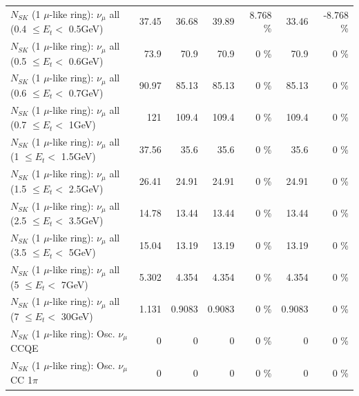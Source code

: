 \begin{table}
\begin{tabular}{| l | r | r | r  r | r  r |}
       $N_{SK}$ (1 $\mu$-like ring): $\nu_{\mu}$ all (0.4 $\leq E_{t} <$ 0.5GeV) &           37.45 &           36.68 &           39.89 &    8.768 \%  &           33.46 &   -8.768 \%  \\ 
       $N_{SK}$ (1 $\mu$-like ring): $\nu_{\mu}$ all (0.5 $\leq E_{t} <$ 0.6GeV) &            73.9 &            70.9 &            70.9 &        0 \%  &            70.9 &        0 \%  \\ 
       $N_{SK}$ (1 $\mu$-like ring): $\nu_{\mu}$ all (0.6 $\leq E_{t} <$ 0.7GeV) &           90.97 &           85.13 &           85.13 &        0 \%  &           85.13 &        0 \%  \\ 
         $N_{SK}$ (1 $\mu$-like ring): $\nu_{\mu}$ all (0.7 $\leq E_{t} <$ 1GeV) &             121 &           109.4 &           109.4 &        0 \%  &           109.4 &        0 \%  \\ 
         $N_{SK}$ (1 $\mu$-like ring): $\nu_{\mu}$ all (1 $\leq E_{t} <$ 1.5GeV) &           37.56 &            35.6 &            35.6 &        0 \%  &            35.6 &        0 \%  \\ 
       $N_{SK}$ (1 $\mu$-like ring): $\nu_{\mu}$ all (1.5 $\leq E_{t} <$ 2.5GeV) &           26.41 &           24.91 &           24.91 &        0 \%  &           24.91 &        0 \%  \\ 
       $N_{SK}$ (1 $\mu$-like ring): $\nu_{\mu}$ all (2.5 $\leq E_{t} <$ 3.5GeV) &           14.78 &           13.44 &           13.44 &        0 \%  &           13.44 &        0 \%  \\ 
         $N_{SK}$ (1 $\mu$-like ring): $\nu_{\mu}$ all (3.5 $\leq E_{t} <$ 5GeV) &           15.04 &           13.19 &           13.19 &        0 \%  &           13.19 &        0 \%  \\ 
           $N_{SK}$ (1 $\mu$-like ring): $\nu_{\mu}$ all (5 $\leq E_{t} <$ 7GeV) &           5.302 &           4.354 &           4.354 &        0 \%  &           4.354 &        0 \%  \\ 
          $N_{SK}$ (1 $\mu$-like ring): $\nu_{\mu}$ all (7 $\leq E_{t} <$ 30GeV) &           1.131 &          0.9083 &          0.9083 &        0 \%  &          0.9083 &        0 \%  \\ 
\hline
\hline
                               $N_{SK}$ (1 $\mu$-like ring): Osc. $\nu_\mu$ CCQE &               0 &               0 &               0 &        0 \%  &               0 &        0 \%  \\ 
                          $N_{SK}$ (1 $\mu$-like ring): Osc. $\nu_\mu$ CC 1$\pi$ &               0 &               0 &               0 &        0 \%  &               0 &        0 \%  \\ 

\end{tabular}
\end{table}
